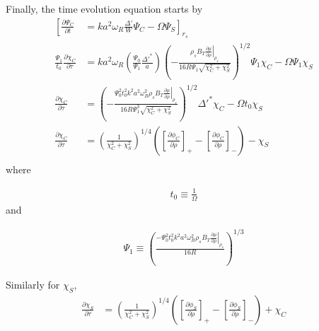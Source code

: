 \documentclass{article}
\begin{document}
Finally, the time evolution equation starts by
\begin{equation} \label{wessonCurrentProfile}
\begin{split}
\left [  \frac{\partial \Psi_C}{\partial t}\right. & = \left. k a^2 \omega_R \frac{\Delta '}{W}\Psi_C - \Omega \Psi_S \right]_{r_s}\\
\frac{\Psi_1}{t_0}\frac{\partial \chi_C}{\partial \tau} & = k a^2 \omega_R \left(  \frac{\Psi_0}{\Psi_1}\frac{\Delta'^{*} }{a} \right)    \left( - \frac{\rho_s B_T \left.\frac{\partial \mu}{\partial \rho}\right|_{\rho_s}}{16 R \Psi_1 \sqrt{\chi_C^2+\chi_S^2} }\right)^{1/2}      \Psi_1 \chi_C - \Omega \Psi_1 \chi_S\\
\frac{\partial \chi_C}{\partial \tau} & =     \left( - \frac{\Psi_0^2 t_0^2 k^2 a^2 \omega_R^2 \rho_s B_T \left.\frac{\partial \mu}{\partial \rho}\right|_{\rho_s}}{16 R \Psi_1^3 \sqrt{\chi_C^2+\chi_S^2} }\right)^{1/2}  \Delta'^{*}    \chi_C - \Omega t_0 \chi_S\\
\frac{\partial \chi_C}{\partial \tau} & =     \left(  \frac{1}{\chi_C^2+\chi_S^2} \right)^{1/4}       \left( \left[\frac{\partial \phi_C}{\partial \rho}\right]_{+}-\left[\frac{\partial \phi_C}{\partial \rho}\right]_{-}    \right) - \chi_S\\
\end{split} 
\end{equation} 
where

\begin{equation} \label{wessonCurrentProfile}
\begin{split}
t_0 \equiv \frac{1}{\Omega}
\end{split} 
\end{equation} 
and

\begin{equation} \label{wessonCurrentProfile}
\begin{split}
\Psi_1 \equiv  \left( \frac{-\Psi_0^2 t_0^2 k^2 a^2 \omega_R^2 \rho_s B_T \left.\frac{\partial \mu}{\partial \rho}\right|_{\rho_s}}{16R} \right ) ^{1/3}
\end{split} 
\end{equation}

Similarly for $\chi_S$, 
\begin{equation} \label{wessonCurrentProfile}
\begin{split}
\frac{\partial \chi_S}{\partial \tau} & =     \left(  \frac{1}{\chi_C^2+\chi_S^2} \right)^{1/4}  \left( \left[\frac{\partial \phi_S}{\partial \rho}\right]_{+}-\left[\frac{\partial \phi_S}{\partial \rho}\right]_{-}    \right) + \chi_C\\
\end{split} 
\end{equation}  
\end{document}
